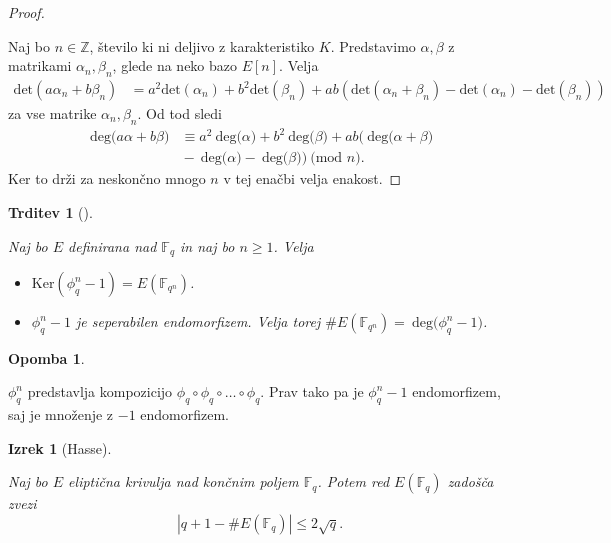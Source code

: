 \documentclass[12pt,a4paper,twoside]{article}
\theoremstyle{definition} %
\newtheorem{opomba}[definicija]{Opomba}
\theoremstyle{plain} %
\newtheorem{izrek}[definicija]{Izrek}
\newtheorem{trditev}[definicija]{Trditev}
\numberwithin{equation}{section}  %
\newcommand{\Z}{\mathbb Z}
\newcommand{\F}{\mathbb F}
\newcommand{\E}[1]{E({#1})}
\newcommand{\MOD}[1]{\ \text{(mod }{#1}\text{)}}
\newcommand{\DEG}[1]{\ \text{deg(}{#1}\text{)}}
\begin{document}
\begin{proof}~

Naj bo $n \in \Z$, število ki ni deljivo z karakteristiko $K$. Predstavimo $\alpha,\beta$ z matrikami $\alpha_n,\beta_n$, glede na neko bazo $E[n]$.
Velja
\begin{align}
\text{det}(a\alpha_n+b\beta_n) &{}=  a^2\text{det}(\alpha_n)+b^2\text{det}(\beta_n) + ab(\text{det}(\alpha_n+\beta_n)-\text{det}(\alpha_n)-\text{det}(\beta_n)) \nonumber
\end{align}
za vse matrike $\alpha_n,\beta_n$.
Od tod sledi
\begin{align}
\DEG{a\alpha+b\beta} &{}\equiv a^2\DEG{\alpha}+b^2\DEG{\beta} + ab(\DEG{\alpha+\beta} \nonumber \\
&{}-\DEG{\alpha}-\DEG{\beta}) \MOD{n}. \nonumber
\end{align}
Ker to drži za neskončno mnogo $n$ v tej enačbi velja enakost.


\end{proof}

\begin{trditev}[]~

\label{trd:4.7}
Naj bo $E$ definirana nad $\F_q$ in naj bo $n \geq 1$. Velja
\begin{itemize}
\item $\text{Ker}(\phi^n_q-1) = \E{\F_{q^n}}$.
\item $\phi^n_q-1$ je seperabilen endomorfizem. Velja torej $\#\E{\F_{q^n}} = \DEG{\phi^n_q-1}$.
\end{itemize}
\end{trditev}

\begin{opomba}~

$\phi^n_q$ predstavlja kompozicijo $\phi_q \circ \phi_q \circ \ldots \circ \phi_q$. Prav tako pa je $\phi^n_q-1$ endomorfizem, saj je množenje z $-1$ endomorfizem.
\end{opomba}

\begin{izrek}[Hasse]~

\label{izr:Hasse}
Naj bo $E$ eliptična krivulja nad končnim poljem $\F_q$.  Potem red $\E{\F_q}$ zadošča zvezi
$$|q+1-\#\E{\F_q}| \leq 2\sqrt{q}.$$
\end{izrek}
\end{document}
